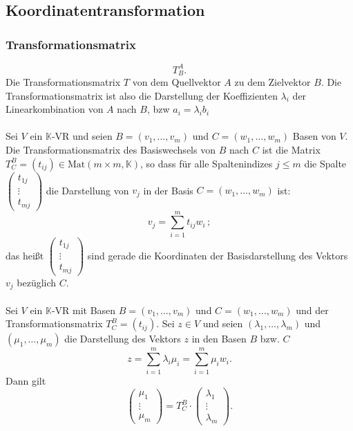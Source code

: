 \documentclass[a4paper,12pt]{article}
\numberwithin{equation}{section}
\begin{document}
\subsection{Koordinatentransformation}
\subsubsection{Transformationsmatrix}
\[ 
        T^A_B
.\] 
Die Transformationsmatrix $T$ von dem Quellvektor $A$ zu dem Zielvektor $B$. Die Transformationsmatrix ist also die Darstellung der Koeffizienten $\lambda _i$ der Linearkombination von $A$ nach $B$, bzw $a_i=\lambda_i b_i$ \\\\
Sei $V$ ein $\mathbb{K}$-VR und seien $B=\left(v_1,\hdots ,v_m\right)$ und $C=\left(w_1,\hdots ,w_m\right)$ Basen von $V$. Die Transformationsmatrix des Basiswechsels von $B$ nach $C$ ist die Matrix $T^B_C=\left(t_{ij}\right) \in \text{Mat}\left(m\times m,\mathbb{K}\right)$, so dass für alle Spaltenindizes $j\leq m$ die Spalte $\left(\begin{matrix}
        t_{1j}\\\vdots \\t_{mj}
\end{matrix}\right)$ die Darstellung von $v_j$ in der Basis $C=\left(w_1,\hdots ,w_m\right)$ ist:
\[ 
        v_j=\sum_{i=1}^{m}t_{ij}w_i
\,;\] 
das heißt $\left(\begin{matrix}
        t_{1j}\\\vdots \\t_{mj}
\end{matrix}\right)$ sind gerade die Koordinaten der Basisdarstellung des Vektors $v_j$ bezüglich $C$.\\\\
Sei $V$ ein $\mathbb{K}$-VR mit Basen $B=\left(v_1,\hdots ,v_m\right)$ und $C=\left(w_1,\hdots ,w_m\right)$ und der Transformationsmatrix $T^B_C=\left(t_{ij}\right)$. Sei $z \in V$ und seien $\left(\lambda _1,\hdots ,\lambda _m\right)$ und $\left(\mu _1,\hdots ,\mu _m\right)$ die Darstellung des Vektors $z$ in den Basen $B$ bzw. $C$
\[ 
        z=\sum_{i=1}^{m}\lambda _i\mu _i=\sum_{i=1}^{m}\mu _iw_i
.\] 
Dann gilt
\[ 
        \left(\begin{matrix}
                \mu _1\\\vdots\\\mu _m
        \end{matrix}\right)=T^B_C\cdot \left(\begin{matrix}
                \lambda _1\\\vdots\\\lambda _m
        \end{matrix}\right)
.\] 
\end{document}
